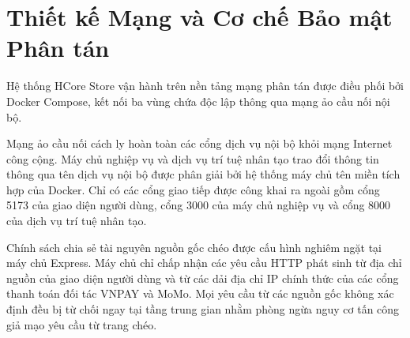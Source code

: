 \section{Thiết kế Mạng và Cơ chế Bảo mật Phân tán}
Hệ thống HCore Store vận hành trên nền tảng mạng phân tán được điều phối bởi Docker Compose, kết nối ba vùng chứa độc lập thông qua mạng ảo cầu nối nội bộ.

Mạng ảo cầu nối cách ly hoàn toàn các cổng dịch vụ nội bộ khỏi mạng Internet công cộng. Máy chủ nghiệp vụ và dịch vụ trí tuệ nhân tạo trao đổi thông tin thông qua tên dịch vụ nội bộ được phân giải bởi hệ thống máy chủ tên miền tích hợp của Docker. Chỉ có các cổng giao tiếp được công khai ra ngoài gồm cổng 5173 của giao diện người dùng, cổng 3000 của máy chủ nghiệp vụ và cổng 8000 của dịch vụ trí tuệ nhân tạo.

Chính sách chia sẻ tài nguyên nguồn gốc chéo được cấu hình nghiêm ngặt tại máy chủ Express. Máy chủ chỉ chấp nhận các yêu cầu HTTP phát sinh từ địa chỉ nguồn của giao diện người dùng và từ các dải địa chỉ IP chính thức của các cổng thanh toán đối tác VNPAY và MoMo. Mọi yêu cầu từ các nguồn gốc không xác định đều bị từ chối ngay tại tầng trung gian nhằm phòng ngừa nguy cơ tấn công giả mạo yêu cầu từ trang chéo.

